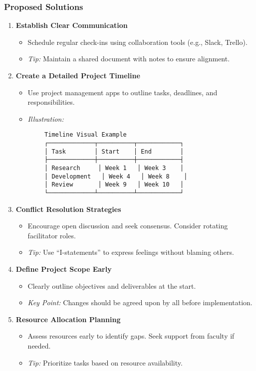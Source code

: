 \documentclass[aspectratio=169]{beamer}
\begin{document}
\begin{frame}[fragile]
    \frametitle{Proposed Solutions}
    \begin{enumerate}
        \item \textbf{Establish Clear Communication}
        \begin{itemize}
            \item Schedule regular check-ins using collaboration tools (e.g., Slack, Trello).
            \item \textit{Tip:} Maintain a shared document with notes to ensure alignment.
        \end{itemize}
        
        \item \textbf{Create a Detailed Project Timeline}
        \begin{itemize}
            \item Use project management apps to outline tasks, deadlines, and responsibilities.
            \item \textit{Illustration:}
            \end{itemize}
            \begin{lstlisting}
        Timeline Visual Example
        ┌─────────────┬──────────┬────────────┐
        │ Task        │ Start    │ End        │
        ├─────────────┼──────────┼────────────┤
        │ Research     │ Week 1   │ Week 3    │
        │ Development   │ Week 4   │ Week 8    │
        │ Review       │ Week 9   │ Week 10   │
        └─────────────┴──────────┴────────────┘
            \end{lstlisting}

        \item \textbf{Conflict Resolution Strategies}
        \begin{itemize}
            \item Encourage open discussion and seek consensus. Consider rotating facilitator roles.
            \item \textit{Tip:} Use “I-statements” to express feelings without blaming others.
        \end{itemize}

        \item \textbf{Define Project Scope Early}
        \begin{itemize}
            \item Clearly outline objectives and deliverables at the start.
            \item \textit{Key Point:} Changes should be agreed upon by all before implementation.
        \end{itemize}

        \item \textbf{Resource Allocation Planning}
        \begin{itemize}
            \item Assess resources early to identify gaps. Seek support from faculty if needed.
            \item \textit{Tip:} Prioritize tasks based on resource availability.
        \end{itemize}
    \end{enumerate}
\end{frame}
\end{document}
